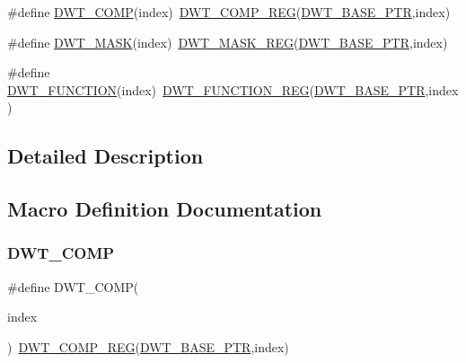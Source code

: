 \begin{DoxyCompactItemize}
\#define \hyperlink{group___d_w_t___register___accessor___macros_ga0b043412191960b9db65c179caef9291}{D\+W\+T\+\_\+\+C\+O\+MP}(index)~\hyperlink{group___d_w_t___register___accessor___macros_ga65ba817e15fd964c25a32b392e4bd8a6}{D\+W\+T\+\_\+\+C\+O\+M\+P\+\_\+\+R\+EG}(\hyperlink{group___d_w_t___peripheral_ga3b46dfb2ea7946c6938028d879c82cb1}{D\+W\+T\+\_\+\+B\+A\+S\+E\+\_\+\+P\+TR},index)
\item 
\#define \hyperlink{group___d_w_t___register___accessor___macros_ga19be475d2412ec79ba2fd2a835ce6055}{D\+W\+T\+\_\+\+M\+A\+SK}(index)~\hyperlink{group___d_w_t___register___accessor___macros_gadc3b258970e8d8b6fac9ed997705979b}{D\+W\+T\+\_\+\+M\+A\+S\+K\+\_\+\+R\+EG}(\hyperlink{group___d_w_t___peripheral_ga3b46dfb2ea7946c6938028d879c82cb1}{D\+W\+T\+\_\+\+B\+A\+S\+E\+\_\+\+P\+TR},index)
\item 
\#define \hyperlink{group___d_w_t___register___accessor___macros_ga0ef1d1ba0a2ddfb38c74c35ab749a652}{D\+W\+T\+\_\+\+F\+U\+N\+C\+T\+I\+ON}(index)~\hyperlink{group___d_w_t___register___accessor___macros_ga8c031182a80181fe644b6ae21491966a}{D\+W\+T\+\_\+\+F\+U\+N\+C\+T\+I\+O\+N\+\_\+\+R\+EG}(\hyperlink{group___d_w_t___peripheral_ga3b46dfb2ea7946c6938028d879c82cb1}{D\+W\+T\+\_\+\+B\+A\+S\+E\+\_\+\+P\+TR},index)
\end{DoxyCompactItemize}


\subsection{Detailed Description}


\subsection{Macro Definition Documentation}
\mbox{\label{group___d_w_t___register___accessor___macros_ga0b043412191960b9db65c179caef9291}} 
\subsubsection{\texorpdfstring{D\+W\+T\+\_\+\+C\+O\+MP}{DWT\_COMP}}
{\footnotesize\ttfamily \#define D\+W\+T\+\_\+\+C\+O\+MP(\begin{DoxyParamCaption}\item[{}]{index }\end{DoxyParamCaption})~\hyperlink{group___d_w_t___register___accessor___macros_ga65ba817e15fd964c25a32b392e4bd8a6}{D\+W\+T\+\_\+\+C\+O\+M\+P\+\_\+\+R\+EG}(\hyperlink{group___d_w_t___peripheral_ga3b46dfb2ea7946c6938028d879c82cb1}{D\+W\+T\+\_\+\+B\+A\+S\+E\+\_\+\+P\+TR},index)}

